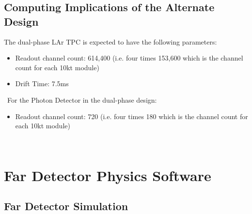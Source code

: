 \subsection{Computing Implications of the Alternate Design}
\label{sec:detectors-sc-alternate}
The dual-phase LAr TPC is expected to have the following parameters:
\begin{itemize}
	\item Readout channel count: 614,400 (i.e. four times 153,600 which is the channel count
	for each 10kt module)
	\item Drift Time: 7.5ms
\end{itemize}
\
For the Photon Detector in the dual-phase design:
\begin{itemize}
	\item Readout channel count: 720 (i.e. four times 180 which is the channel count
	for each 10kt module)
\end{itemize}
\
\section{Far Detector Physics Software}
\label{sec:detectors-sc-physics-software}


\subsection{Far Detector Simulation}
\label{sec:detectors-sc-physics-software-simulation-fd}

